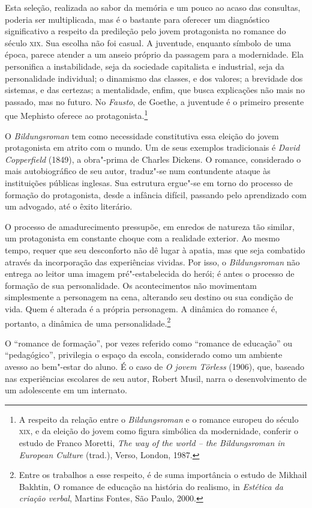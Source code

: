 Esta seleção, realizada ao sabor da memória e um pouco
ao acaso das consultas, poderia ser multiplicada, mas é o bastante para
oferecer um diagnóstico significativo a respeito da predileção pelo
jovem protagonista no romance do século \textsc{xix}. Sua escolha não foi
casual. A juventude, enquanto símbolo de uma época, parece atender a um
anseio próprio da passagem para a modernidade. Ela personifica a
instabilidade, seja da sociedade capitalista e industrial, seja da
personalidade individual; o dinamismo das classes, e dos valores; a
brevidade dos sistemas, e das certezas; a mentalidade, enfim, que busca
explicações não mais no passado, mas no futuro. No
\textit{Fausto}, de Goethe, a juventude é o
primeiro presente que Mephisto oferece ao protagonista.\footnote{ A
respeito da relação entre o \textit{Bildungsroman} e o romance europeu
do século \textsc{xix}, e da eleição do jovem como figura simbólica da
modernidade, conferir o estudo de Franco Moretti, \textit{The way of
the world -- the Bildungsroman in European Culture} (trad.), Verso,
London, 1987.} 

O \textit{Bildungsroman} tem
como necessidade constitutiva essa eleição do jovem protagonista em
atrito com o mundo. Um de seus exemplos tradicionais é
\textit{David Copperfield} (1849), a obra"-prima de Charles Dickens. 
O romance, considerado o mais
autobiográfico de seu autor, traduz"-se num contundente ataque às
instituições públicas inglesas. Sua estrutura ergue"-se em torno do
processo de formação do protagonista, desde a infância difícil,
passando pelo aprendizado com um advogado, até o êxito literário. 


O processo de amadurecimento pressupõe, em enredos de
natureza tão similar, um protagonista em constante choque com a
realidade exterior. Ao mesmo tempo, requer que seu desconforto não dê
lugar à apatia, mas que seja combatido através da incorporação das
experiências vividas. Por isso, o
\textit{Bildungsroman} não entrega ao leitor
uma imagem pré"-estabelecida do herói; é antes o processo de formação
de sua personalidade. Os acontecimentos não movimentam simplesmente a
personagem na cena, alterando seu destino ou sua condição de vida. Quem
é alterada é a própria personagem. A dinâmica do romance é, portanto, a
dinâmica de uma personalidade.\footnote{Entre os trabalhos a esse respeito, 
é de suma importância o estudo de Mikhail Bakhtin, O romance de educação na história do
realismo, in \textit{Estética da criação verbal}, Martins Fontes, São Paulo, 2000.} 

O ``romance de formação'', por vezes referido como
``romance de educação'' ou ``pedagógico'', privilegia o espaço da escola,
considerado como um ambiente avesso ao bem"-estar do aluno. É o caso
de \textit{O jovem Törless} (1906), que,
baseado nas experiências escolares de seu autor, Robert Musil, narra o
desenvolvimento de um adolescente em um internato.

